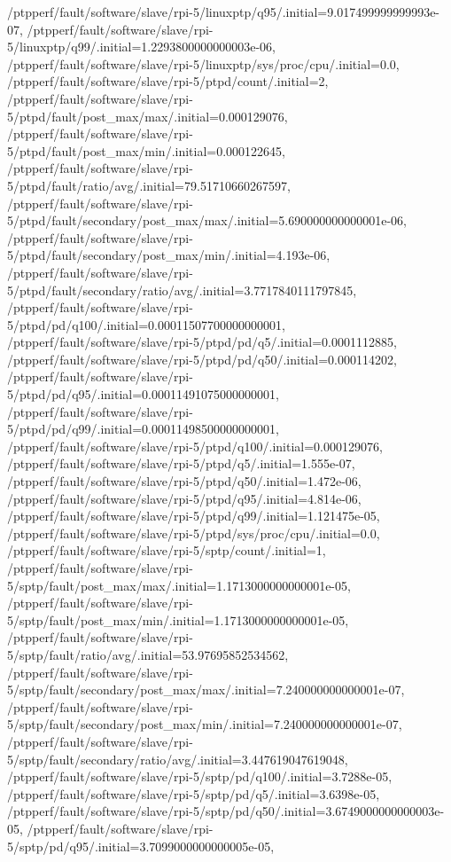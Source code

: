 {    /ptpperf/fault/software/slave/rpi-5/linuxptp/q95/.initial=9.017499999999993e-07,
    /ptpperf/fault/software/slave/rpi-5/linuxptp/q99/.initial=1.2293800000000003e-06,
    /ptpperf/fault/software/slave/rpi-5/linuxptp/sys/proc/cpu/.initial=0.0,
    /ptpperf/fault/software/slave/rpi-5/ptpd/count/.initial=2,
    /ptpperf/fault/software/slave/rpi-5/ptpd/fault/post_max/max/.initial=0.000129076,
    /ptpperf/fault/software/slave/rpi-5/ptpd/fault/post_max/min/.initial=0.000122645,
    /ptpperf/fault/software/slave/rpi-5/ptpd/fault/ratio/avg/.initial=79.51710660267597,
    /ptpperf/fault/software/slave/rpi-5/ptpd/fault/secondary/post_max/max/.initial=5.690000000000001e-06,
    /ptpperf/fault/software/slave/rpi-5/ptpd/fault/secondary/post_max/min/.initial=4.193e-06,
    /ptpperf/fault/software/slave/rpi-5/ptpd/fault/secondary/ratio/avg/.initial=3.7717840111797845,
    /ptpperf/fault/software/slave/rpi-5/ptpd/pd/q100/.initial=0.00011507700000000001,
    /ptpperf/fault/software/slave/rpi-5/ptpd/pd/q5/.initial=0.0001112885,
    /ptpperf/fault/software/slave/rpi-5/ptpd/pd/q50/.initial=0.000114202,
    /ptpperf/fault/software/slave/rpi-5/ptpd/pd/q95/.initial=0.00011491075000000001,
    /ptpperf/fault/software/slave/rpi-5/ptpd/pd/q99/.initial=0.00011498500000000001,
    /ptpperf/fault/software/slave/rpi-5/ptpd/q100/.initial=0.000129076,
    /ptpperf/fault/software/slave/rpi-5/ptpd/q5/.initial=1.555e-07,
    /ptpperf/fault/software/slave/rpi-5/ptpd/q50/.initial=1.472e-06,
    /ptpperf/fault/software/slave/rpi-5/ptpd/q95/.initial=4.814e-06,
    /ptpperf/fault/software/slave/rpi-5/ptpd/q99/.initial=1.121475e-05,
    /ptpperf/fault/software/slave/rpi-5/ptpd/sys/proc/cpu/.initial=0.0,
    /ptpperf/fault/software/slave/rpi-5/sptp/count/.initial=1,
    /ptpperf/fault/software/slave/rpi-5/sptp/fault/post_max/max/.initial=1.1713000000000001e-05,
    /ptpperf/fault/software/slave/rpi-5/sptp/fault/post_max/min/.initial=1.1713000000000001e-05,
    /ptpperf/fault/software/slave/rpi-5/sptp/fault/ratio/avg/.initial=53.97695852534562,
    /ptpperf/fault/software/slave/rpi-5/sptp/fault/secondary/post_max/max/.initial=7.240000000000001e-07,
    /ptpperf/fault/software/slave/rpi-5/sptp/fault/secondary/post_max/min/.initial=7.240000000000001e-07,
    /ptpperf/fault/software/slave/rpi-5/sptp/fault/secondary/ratio/avg/.initial=3.447619047619048,
    /ptpperf/fault/software/slave/rpi-5/sptp/pd/q100/.initial=3.7288e-05,
    /ptpperf/fault/software/slave/rpi-5/sptp/pd/q5/.initial=3.6398e-05,
    /ptpperf/fault/software/slave/rpi-5/sptp/pd/q50/.initial=3.6749000000000003e-05,
    /ptpperf/fault/software/slave/rpi-5/sptp/pd/q95/.initial=3.7099000000000005e-05,
}
